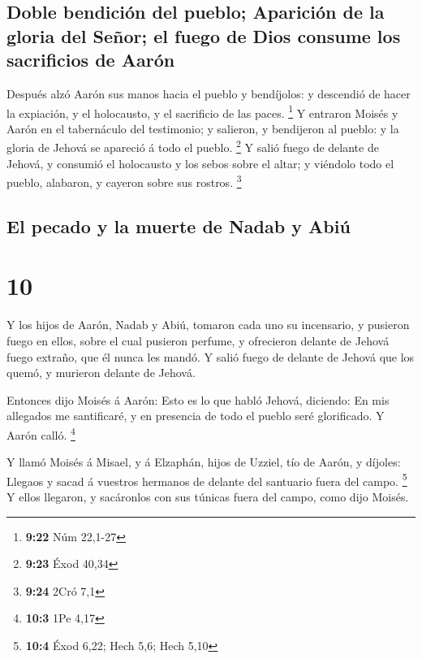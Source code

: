 \hypertarget{doble-bendiciuxf3n-del-pueblo-apariciuxf3n-de-la-gloria-del-seuxf1or-el-fuego-de-dios-consume-los-sacrificios-de-aaruxf3n}{%
\subsection{Doble bendición del pueblo; Aparición de la gloria del
Señor; el fuego de Dios consume los sacrificios de
Aarón}\label{doble-bendiciuxf3n-del-pueblo-apariciuxf3n-de-la-gloria-del-seuxf1or-el-fuego-de-dios-consume-los-sacrificios-de-aaruxf3n}}

 Después alzó Aarón sus manos hacia el pueblo y bendíjolos:
y descendió de hacer la expiación, y el holocausto, y el sacrificio de
las paces. \footnote{\textbf{9:22} Núm 22,1-27}  Y entraron
Moisés y Aarón en el tabernáculo del testimonio; y salieron, y
bendijeron al pueblo: y la gloria de Jehová se apareció á todo el
pueblo. \footnote{\textbf{9:23} Éxod 40,34}  Y salió fuego
de delante de Jehová, y consumió el holocausto y los sebos sobre el
altar; y viéndolo todo el pueblo, alabaron, y cayeron sobre sus rostros.
\footnote{\textbf{9:24} 2Cró 7,1}

\hypertarget{el-pecado-y-la-muerte-de-nadab-y-abiuxfa}{%
\subsection{El pecado y la muerte de Nadab y
Abiú}\label{el-pecado-y-la-muerte-de-nadab-y-abiuxfa}}

\hypertarget{section-9}{%
\section{10}\label{section-9}}

 Y los hijos de Aarón, Nadab y Abiú, tomaron cada uno su
incensario, y pusieron fuego en ellos, sobre el cual pusieron perfume, y
ofrecieron delante de Jehová fuego extraño, que él nunca les mandó.
 Y salió fuego de delante de Jehová que los quemó, y
murieron delante de Jehová.

 Entonces dijo Moisés á Aarón: Esto es lo que habló Jehová,
diciendo: En mis allegados me santificaré, y en presencia de todo el
pueblo seré glorificado. Y Aarón calló. \footnote{\textbf{10:3} 1Pe 4,17}

 Y llamó Moisés á Misael, y á Elzaphán, hijos de Uzziel, tío
de Aarón, y díjoles: Llegaos y sacad á vuestros hermanos de delante del
santuario fuera del campo. \footnote{\textbf{10:4} Éxod 6,22; Hech 5,6;
  Hech 5,10}  Y ellos llegaron, y sacáronlos con sus túnicas
fuera del campo, como dijo Moisés.

